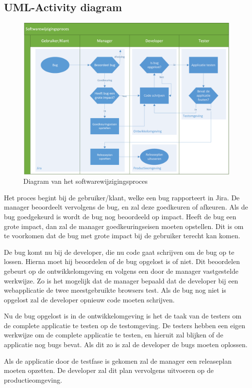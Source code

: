 \documentclass[12pt]{article}
\begin{document}
\subsection{UML-Activity diagram}
\begin{figure}[H]
	\includegraphics[width=\textwidth]{images/UMLActivityDiagram.png}
	\caption{Diagram van het softwarewijzigingsproces}
\end{figure}
Het proces begint bij de gebruiker/klant, welke een bug rapporteert in Jira. De manager beoordeelt vervolgens de bug, en zal deze goedkeuren of afkeuren. Als de bug goedgekeurd is wordt de bug nog beoordeeld op impact. Heeft de bug een grote impact, dan zal de manager goedkeuringseisen moeten opstellen. Dit is om te voorkomen dat de bug met grote impact bij de gebruiker terecht kan komen.

De bug komt nu bij de developer, die nu code gaat schrijven om de bug op te lossen. Hierna moet hij beoordelen of de bug opgelost is of niet. Dit beoordelen gebeurt op de ontwikkelomgeving en volgens een door de manager vastgestelde werkwijze. Zo is het mogelijk dat de manager bepaald dat de developer bij een webapplicatie de twee meestgebruikte browsers test. Als de bug nog niet is opgelost zal de developer opnieuw code moeten schrijven.

Nu de bug opgelost is in de ontwikkelomgeving is het de taak van de testers om de complete applicatie te testen op de testomgeving. De testers hebben een eigen werkwijze om de complete applicatie te testen, en hieruit zal blijken of de applicatie nog bugs bevat. Als dit zo is zal de developer de bugs moeten oplossen.

Als de applicatie door de testfase is gekomen zal de manager een releaseplan moeten opzetten. De developer zal dit plan vervolgens uitvoeren op de productieomgeving.
\end{document}
